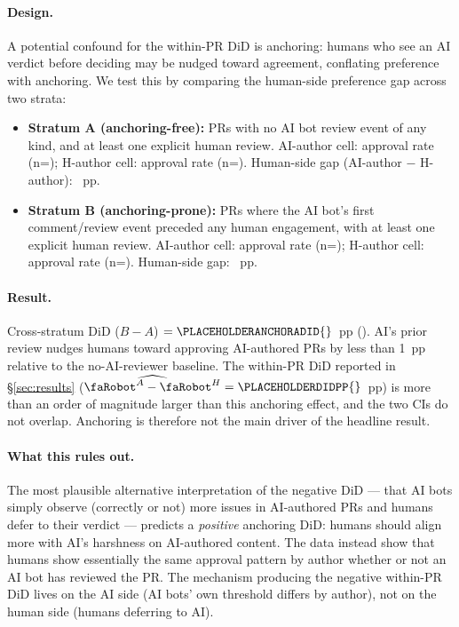 
\paragraph{Design.} A potential confound for the within-PR DiD is anchoring: humans who see an AI verdict before deciding may be nudged toward agreement, conflating preference with anchoring. We test this by comparing the human-side preference gap across two strata:

\begin{itemize}
\item \textbf{Stratum A (anchoring-free):} \PLACEHOLDERANCHORAN{} PRs with no AI bot review event of any kind, and at least one explicit human review. AI-author cell: \PLACEHOLDERANCHORAAIRATE{} approval rate (n=\PLACEHOLDERANCHORANAI{}); H-author cell: \PLACEHOLDERANCHORAHRATE{} approval rate (n=\PLACEHOLDERANCHORANH{}). Human-side gap (AI-author $-$ H-author): \PLACEHOLDERANCHORAGAP{}~pp.
\item \textbf{Stratum B (anchoring-prone):} \PLACEHOLDERANCHORBN{} PRs where the AI bot's first comment/review event preceded any human engagement, with at least one explicit human review. AI-author cell: \PLACEHOLDERANCHORBAIRATE{} approval rate (n=\PLACEHOLDERANCHORBNAI{}); H-author cell: \PLACEHOLDERANCHORBHRATE{} approval rate (n=\PLACEHOLDERANCHORBNH{}). Human-side gap: \PLACEHOLDERANCHORBGAP{}~pp.
\end{itemize}

\paragraph{Result.} Cross-stratum DiD ($B - A$) $= \PLACEHOLDERANCHORADID{}$~pp (\PLACEHOLDERANCHORDIDCI{}). AI's prior review nudges humans toward approving AI-authored PRs by less than 1~pp relative to the no-AI-reviewer baseline. The within-PR DiD reported in \S\ref{sec:results} ($\widehat{\rbt^A - \rbt^H} = \PLACEHOLDERDIDPP{}$~pp) is more than an order of magnitude larger than this anchoring effect, and the two CIs do not overlap. Anchoring is therefore not the main driver of the headline result.

\paragraph{What this rules out.} The most plausible alternative interpretation of the negative DiD --- that AI bots simply observe (correctly or not) more issues in AI-authored PRs and humans defer to their verdict --- predicts a \emph{positive} anchoring DiD: humans should align more with AI's harshness on AI-authored content. The data instead show that humans show essentially the same approval pattern by author whether or not an AI bot has reviewed the PR. The mechanism producing the negative within-PR DiD lives on the AI side (AI bots' own threshold differs by author), not on the human side (humans deferring to AI).

